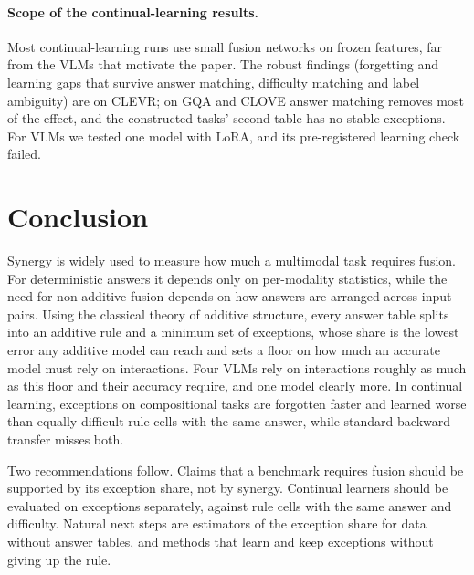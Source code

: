 \paragraph{Scope of the continual-learning results.}
Most continual-learning runs use small fusion networks on frozen features, far from the VLMs that motivate the paper.
The robust findings (forgetting and learning gaps that survive answer matching, difficulty matching and label
ambiguity) are on CLEVR; on GQA and CLOVE answer matching removes most of the effect, and the constructed tasks' second
table has no stable exceptions. For VLMs we tested one model with LoRA, and its pre-registered learning check failed.

\section{Conclusion}
\label{sec:conclusion}
Synergy is widely used to measure how much a multimodal task requires fusion. For deterministic answers it depends
only on per-modality statistics, while the need for non-additive fusion depends on how answers are arranged across
input pairs. Using the classical theory of additive structure, every answer table splits into an additive rule and a
minimum set of exceptions, whose share is the lowest error any additive model can reach and sets a floor on how much an
accurate model must rely on interactions. Four VLMs rely on interactions roughly as much as this floor and their
accuracy require, and one model clearly more. In continual learning, exceptions on compositional tasks are forgotten
faster and learned worse than equally difficult rule cells with the same answer, while standard backward transfer
misses both.

Two recommendations follow. Claims that a benchmark requires fusion should be supported by its exception share, not
by synergy. Continual learners should be evaluated on exceptions separately, against rule cells with the same answer
and difficulty. Natural next steps are estimators of the exception share for data without answer tables, and methods
that learn and keep exceptions without giving up the rule.

